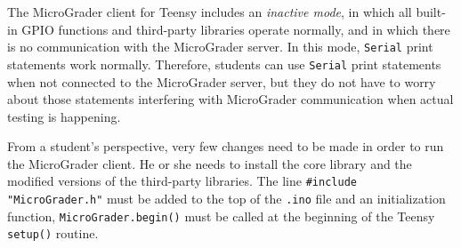\documentclass[12pt]{article}
\begin{document}
\begin{appendices}
The MicroGrader client for Teensy includes an \textit{inactive mode}, in which all built-in GPIO functions and third-party libraries operate normally, and in which there is no communication with the MicroGrader server.  In this mode, \texttt{Serial} print statements work normally.  Therefore, students can use \texttt{Serial} print statements when not connected to the MicroGrader server, but they do not have to worry about those statements interfering with MicroGrader communication when actual testing is happening.

From a student's perspective, very few changes need to be made in order to run the MicroGrader client.  He or she needs to install the core library and the modified versions of the third-party libraries.  The line \verb+#include "MicroGrader.h"+ must be added to the top of the \texttt{.ino} file and an initialization function, \texttt{MicroGrader.begin()} must be called at the beginning of the Teensy \texttt{setup()} routine.

\end{appendices}
\end{document}
